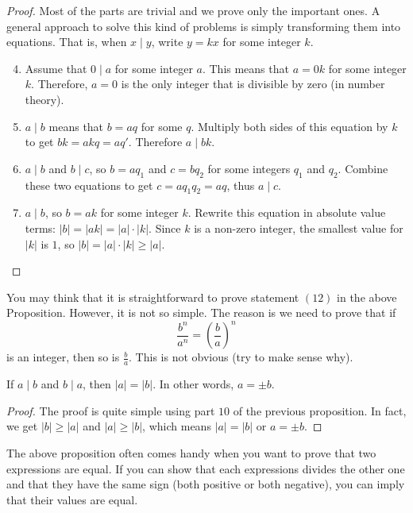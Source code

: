 \documentclass{subfile}
\begin{document}
	\begin{proof}
		Most of the parts are trivial and we prove only the important ones. A general approach to solve this kind of problems is simply transforming them into equations. That is, when $x\mid y$, write $y=kx$ for some integer $k$.
		\begin{enumerate}
			\setcounter{enumi}{3}
			\item Assume that $0\mid a$ for some integer $a$. This means that $a=0k$ for some integer $k$. Therefore, $a=0$ is the only integer that is divisible by zero (in number theory).
			\setcounter{enumi}{5}
			\item $a\mid b$ means that $b=aq$ for some $q$. Multiply both sides of this equation by $k$ to get $bk = akq=aq'$. Therefore $a\mid bk$.
			\setcounter{enumi}{8}
			\item $a\mid b$ and $b\mid c$, so $b=aq_1$ and $c=bq_2$ for some integers $q_1$ and $q_2$. Combine these two equations to get $c = aq_1q_2 = aq$, thus $a\mid c$.
			\setcounter{enumi}{9}
			\item $a\mid b$, so $b = ak$ for some integer $k$. Rewrite this equation in absolute value terms: $|b| = |ak| = |a| \cdot |k|$. Since $k$ is a non-zero integer, the smallest value for $|k|$ is $1$, so $|b| = |a| \cdot |k| \geq |a|$.
			\setcounter{enumi}{11}
		\end{enumerate}
	\end{proof}

	\begin{note}
	    You may think that it is straightforward to prove statement $(12)$ in the above Proposition. However, it is not so simple. The reason is we need to prove that if $$\frac{b^n}{a^n}=\left(\frac{b}{a}\right)^n$$ is an integer, then so is $\frac{b}{a}$. This is not obvious (try to make sense why).
	\end{note}

	\begin{proposition}\label{prop:bothdivide}
		If $a \mid b$ and $b \mid a$, then  $|a|=|b|$. In other words, $a=\pm b$.
	\end{proposition}

	\begin{proof}
		The proof is quite simple using part $10$ of the previous proposition. In fact, we get $|b| \geq |a|$ and $|a| \geq |b|$, which means $|a| = |b|$ or $a = \pm b$.
	\end{proof}
	The above proposition often comes handy when you want to prove that two expressions are equal. If you can show that each expressions divides the other one and that they have the same sign (both positive or both negative), you can imply that their values are equal.
\end{document}
